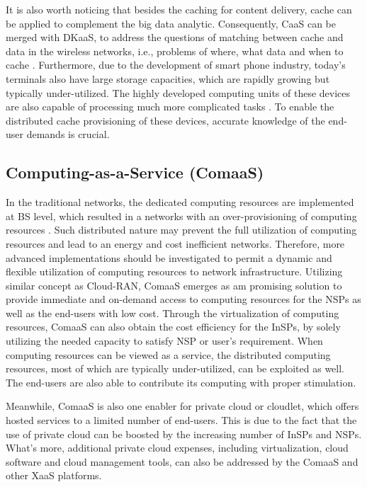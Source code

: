 \documentclass[12pt,draftclsnofoot,onecolumn]{IEEEtran}
\begin{document}
It is also worth noticing that besides the caching for content
delivery, cache can be applied to complement the big data
analytic. Consequently, CaaS can be merged with DKaaS, to address
the questions of matching between cache and data in the wireless
networks, i.e., problems of where, what data and when to cache
\cite{Bi}. Furthermore, due to the development of smart phone
industry, today's terminals also have large storage capacities,
which are rapidly growing but typically under-utilized. The highly
developed computing units of these devices are also capable of
processing much more complicated tasks \cite{Chang2}. To enable
the distributed cache provisioning of these devices, accurate
knowledge of the end-user demands is crucial.

\subsection{Computing-as-a-Service (ComaaS)}

In the traditional networks, the dedicated computing resources are
implemented at BS level, which resulted in a networks with an
over-provisioning of computing resources \cite{Rost2}. Such
distributed nature may prevent the full utilization of computing
resources and lead to an energy and cost inefficient networks.
Therefore, more advanced implementations should be investigated to
permit a dynamic and flexible utilization of computing resources
to network infrastructure. Utilizing similar concept as Cloud-RAN,
ComaaS emerges as am promising solution to provide immediate and
on-demand access to computing resources for the NSPs as well as
the end-users with low cost. Through the virtualization of
computing resources, ComaaS can also obtain the cost efficiency
for the InSPs, by solely utilizing the needed capacity to satisfy
NSP or user's requirement. When computing resources can be viewed
as a service, the distributed computing resources, most of which
are typically under-utilized, can be exploited as well. The
end-users are also able to contribute its computing with proper
stimulation.\par

Meanwhile, ComaaS is also one enabler for private cloud or
cloudlet, which offers hosted services to a limited number of
end-users. This is due to the fact that the use of private cloud
can be boosted by the increasing number of InSPs and NSPs. What's
more, additional private cloud expenses, including virtualization,
cloud software and cloud management tools, can also be addressed
by the ComaaS and other XaaS platforms.
\end{document}
